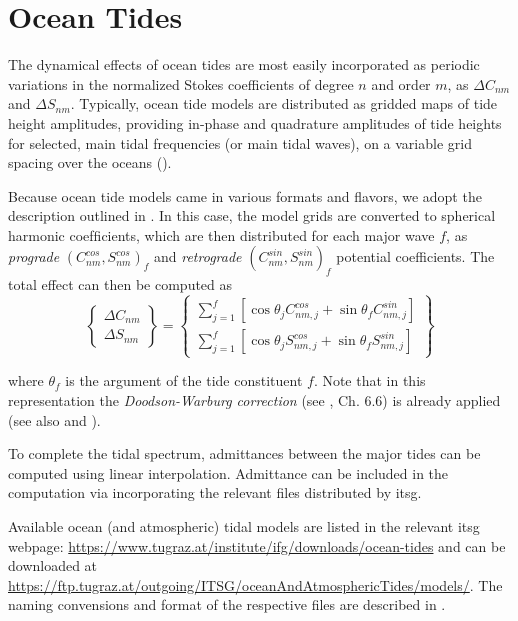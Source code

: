 \section{Ocean Tides}\label{sec:ocean-tides}

The dynamical eﬀects of ocean tides are most easily incorporated as periodic variations in 
the normalized Stokes coeﬃcients of degree $n$ and order $m$, as $\Delta C_{nm}$ and $\Delta S_{nm}$. 
Typically, ocean tide models are distributed as gridded maps of tide height amplitudes, providing 
in-phase and quadrature amplitudes of tide heights for selected, main tidal frequencies (or main 
tidal waves), on a variable grid spacing over the oceans (\cite{iers2010}). 

Because ocean tide models came in various formats and flavors, we adopt the description outlined in 
\cite{Torsten23}. In this case, the model grids are converted to spherical harmonic coefﬁcients, 
which are then distributed for each major wave $f$, as \emph{prograde} $(C^{cos}_{nm}, S^{cos}_{nm})_f$ 
and \emph{retrograde} $(C^{sin}_{nm}, S^{sin}_{nm})_f$ potential coefficients. The total effect can 
then be computed as 
\begin{equation}
    \begin{Bmatrix}\Delta C_{nm} \\ \Delta S_{nm}\end{Bmatrix} = 
    \begin{Bmatrix}
        \sum_{j=1}^{f} \left[ \cos{\theta _j} C^{cos}_{nm, j} + \sin{\theta _f} C^{sin}_{nm, j} \right] \\
        \sum_{j=1}^{f} \left[ \cos{\theta _j} S^{cos}_{nm, j} + \sin{\theta _f} S^{sin}_{nm, j} \right]
    \end{Bmatrix}
\end{equation}

where $\theta _f$ is the argument of the tide constituent $f$. Note that in this representation the 
\emph{Doodson-Warburg correction} (see \cite{iers2010}, Ch. 6.6) is already applied (see also 
\cite{Lasser2020} and \cite{Rieser2012}).

To complete the tidal spectrum, admittances between the major tides can be computed using linear 
interpolation. Admittance can be included in the computation via incorporating the relevant files 
distributed by \gls{itsg}.

Available ocean (and atmospheric) tidal models are listed in the relevant \gls{itsg} webpage: 
\url{https://www.tugraz.at/institute/ifg/downloads/ocean-tides} and can be downloaded at 
\url{https://ftp.tugraz.at/outgoing/ITSG/oceanAndAtmosphericTides/models/}. The naming convensions 
and format of the respective files are described in \cite{Torsten23}.


